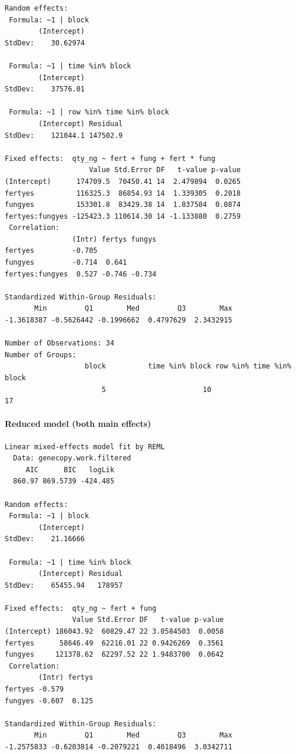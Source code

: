 \documentclass[twoside,12pt,final]{ucthesis-CA2012}
\begin{document}
\begin{ucmainmatter}
\begin{verbatim}
Random effects:
 Formula: ~1 | block
        (Intercept)
StdDev:    30.62974

 Formula: ~1 | time %in% block
        (Intercept)
StdDev:    37576.01

 Formula: ~1 | row %in% time %in% block
        (Intercept) Residual
StdDev:    121044.1 147502.9

Fixed effects:  qty_ng ~ fert + fung + fert * fung 
                    Value Std.Error DF   t-value p-value
(Intercept)      174709.5  70450.41 14  2.479894  0.0265
fertyes          116325.3  86854.93 14  1.339305  0.2018
fungyes          153301.8  83429.38 14  1.837504  0.0874
fertyes:fungyes -125423.3 110614.30 14 -1.133880  0.2759
 Correlation: 
                (Intr) fertys fungys
fertyes         -0.705              
fungyes         -0.714  0.641       
fertyes:fungyes  0.527 -0.746 -0.734

Standardized Within-Group Residuals:
       Min         Q1        Med         Q3        Max 
-1.3618387 -0.5626442 -0.1996662  0.4797629  2.3432915 

Number of Observations: 34
Number of Groups: 
                   block          time %in% block row %in% time %in% block 
                       5                       10                       17 
\end{verbatim}
\hypertarget{reduced-model-both-main-effects}{%
\paragraph{Reduced model (both main effects)}\label{reduced-model-both-main-effects}}
\begin{verbatim}
Linear mixed-effects model fit by REML
  Data: genecopy.work.filtered 
     AIC      BIC   logLik
  860.97 869.5739 -424.485

Random effects:
 Formula: ~1 | block
        (Intercept)
StdDev:    21.16666

 Formula: ~1 | time %in% block
        (Intercept) Residual
StdDev:    65455.94   178957

Fixed effects:  qty_ng ~ fert + fung 
                Value Std.Error DF   t-value p-value
(Intercept) 186043.92  60829.47 22 3.0584503  0.0058
fertyes      58646.49  62216.01 22 0.9426269  0.3561
fungyes     121378.62  62297.52 22 1.9483700  0.0642
 Correlation: 
        (Intr) fertys
fertyes -0.579       
fungyes -0.607  0.125

Standardized Within-Group Residuals:
       Min         Q1        Med         Q3        Max 
-1.2575833 -0.6203814 -0.2079221  0.4018496  3.0342711 


\end{verbatim}
\end{ucmainmatter}
\end{document}
